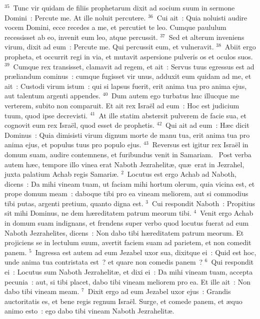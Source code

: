 ${}^{35}$~Tunc vir quidam de filiis prophetarum dixit ad socium suum in sermone Domini~: Percute me. At ille noluit percutere.
${}^{36}$~Cui ait~: Quia noluisti audire vocem Domini, ecce recedes a me, et percutiet te leo. Cumque paululum recessisset ab eo, invenit eum leo, atque percussit.
${}^{37}$~Sed et alterum inveniens virum, dixit ad eum~: Percute me. Qui percussit eum, et vulneravit.
${}^{38}$~Abiit ergo propheta, et occurrit regi in via, et mutavit aspersione pulveris os et oculos suos.
${}^{39}$~Cumque rex transisset, clamavit ad regem, et ait~: Servus tuus egressus est ad pr\ae liandum cominus~: cumque fugisset vir unus, adduxit eum quidam ad me, et ait~: Custodi virum istum~: qui si lapsus fuerit, erit anima tua pro anima ejus, aut talentum argenti appendes.
${}^{40}$~Dum autem ego turbatus huc illucque me verterem, subito non comparuit. Et ait rex Isra\"el ad eum~: Hoc est judicium tuum, quod ipse decrevisti.
${}^{41}$~At ille statim abstersit pulverem de facie sua, et cognovit eum rex Isra\"el, quod esset de prophetis.
${}^{42}$~Qui ait ad eum~: H\ae c dicit Dominus~: Quia dimisisti virum dignum morte de manu tua, erit anima tua pro anima ejus, et populus tuus pro populo ejus.
${}^{43}$~Reversus est igitur rex Isra\"el in domum suam, audire contemnens, et furibundus venit in Samariam.
~Post verba autem h\ae c, tempore illo vinea erat Naboth Jezrahelit\ae , qu\ae\ erat in Jezrahel, juxta palatium Achab regis Samari\ae .
${}^{2}$~Locutus est ergo Achab ad Naboth, dicens~: Da mihi vineam tuam, ut faciam mihi hortum olerum, quia vicina est, et prope domum meam~: daboque tibi pro ea vineam meliorem, aut si commodius tibi putas, argenti pretium, quanto digna est.
${}^{3}$~Cui respondit Naboth~: Propitius sit mihi Dominus, ne dem h\ae reditatem patrum meorum tibi.
${}^{4}$~Venit ergo Achab in domum suam indignans, et frendens super verbo quod locutus fuerat ad eum Naboth Jezrahelites, dicens~: Non dabo tibi h\ae reditatem patrum meorum. Et projiciens se in lectulum suum, avertit faciem suam ad parietem, et non comedit panem.
${}^{5}$~Ingressa est autem ad eum Jezabel uxor sua, dixitque ei~: Quid est hoc, unde anima tua contristata est~? et quare non comedis panem~?
${}^{6}$~Qui respondit ei~: Locutus sum Naboth Jezrahelit\ae , et dixi ei~: Da mihi vineam tuam, accepta pecunia~: aut, si tibi placet, dabo tibi vineam meliorem pro ea. Et ille ait~: Non dabo tibi vineam meam.
${}^{7}$~Dixit ergo ad eum Jezabel uxor ejus~: Grandis auctoritatis es, et bene regis regnum Isra\"el. Surge, et comede panem, et \ae quo animo esto~: ego dabo tibi vineam Naboth Jezrahelit\ae .


